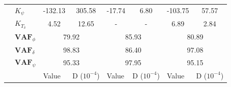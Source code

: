 \begin{table}[]
\begin{tabular}{llcccccc}
                                 & $K_\psi $             & -132.13                                    & 305.58                                             & -17.74                                     & 6.80                                               & -103.75                                    & 57.57                                              \\
                                 & $K_{T_\delta}$        & 4.52                                       & 12.65                                              & -                                          & -                                                  & 6.89                                       & 2.84                                               \\ \cline{2-8} 
                                 & $\mathbf{VAF}_\phi$   & \multicolumn{2}{c}{79.92}                                                                       & \multicolumn{2}{c}{85.93}                                                                       & \multicolumn{2}{c}{80.89}                                                                       \\
                                 & $\mathbf{VAF}_\delta$ & \multicolumn{2}{c}{98.83}                                                                       & \multicolumn{2}{c}{86.40}                                                                       & \multicolumn{2}{c}{97.08}                                                                       \\
                                 & $\mathbf{VAF}_\psi$   & \multicolumn{2}{c}{95.33}                                                                       & \multicolumn{2}{c}{97.95}                                                                       & \multicolumn{2}{c}{95.15}                                                                       \\ \hline
                                 &                       & \multicolumn{1}{l}{\multirow{2}{*}{Value}} & \multicolumn{1}{l}{\multirow{2}{*}{D ($10^{-4}$)}} & \multicolumn{1}{l}{\multirow{2}{*}{Value}} & \multicolumn{1}{l}{\multirow{2}{*}{D ($10^{-4}$)}} & \multicolumn{1}{l}{\multirow{2}{*}{Value}} & \multicolumn{1}{l}{\multirow{2}{*}{D ($10^{-4}$)}} \\
                                 &                       & \multicolumn{1}{l}{}                       & \multicolumn{1}{l}{}                               & \multicolumn{1}{l}{}                       & \multicolumn{1}{l}{}                               & \multicolumn{1}{l}{}                       & \multicolumn{1}{l}{}                               \\ \cline{3-8} 

\end{tabular}
\end{table}
